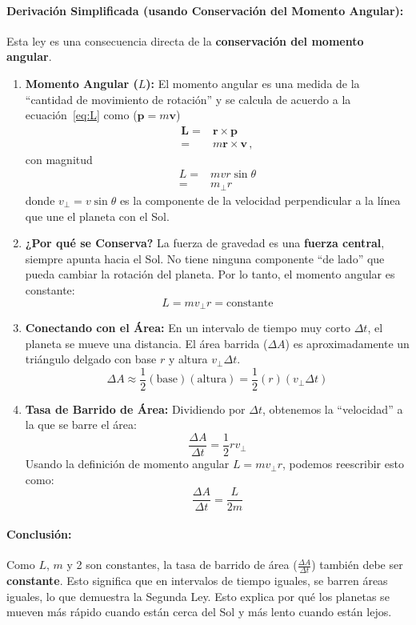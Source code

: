 \documentclass[11pt,a4paper]{book}
\begin{document}
\paragraph{Derivación Simplificada (usando Conservación del Momento Angular):}
Esta ley es una consecuencia directa de la \textbf{conservación del momento angular}.
\begin{enumerate}
    \item \textbf{Momento Angular ($L$):} El momento angular es una medida de la ``cantidad de movimiento de rotación'' y se calcula de acuerdo a la ecuación~\eqref{eq:L} como ($\boldsymbol{p} = m\boldsymbol{v}$)
    \begin{align*}
        \boldsymbol{L} = &\boldsymbol{r}\times\boldsymbol{p}\nonumber\\
        =& m \boldsymbol{r}\times\boldsymbol{v}\,,
    \end{align*}
    con magnitud
    \begin{align}
    \label{eq:Leqmvr}
     L =& m v r\sin\theta\nonumber\\
       =& m_{\perp} r
    \end{align}
    donde $v_{\perp}=v\sin\theta$ es la componente de la velocidad perpendicular a la línea que une el planeta con el Sol.

    \item \textbf{¿Por qué se Conserva?} La fuerza de gravedad es una \textbf{fuerza central}, siempre apunta hacia el Sol. No tiene ninguna componente ``de lado'' que pueda cambiar la rotación del planeta. Por lo tanto, el momento angular es constante:
    \[ L = m v_{\perp} r = \text{constante} \]

    \item \textbf{Conectando con el Área:} En un intervalo de tiempo muy corto $\Delta t$, el planeta se mueve una distancia. El área barrida ($\Delta A$) es aproximadamente un triángulo delgado con base $r$ y altura $v_{\perp} \Delta t$.
    \[ \Delta A \approx \frac{1}{2} (\text{base}) (\text{altura}) = \frac{1}{2} (r) (v_{\perp} \Delta t) \]

    \item \textbf{Tasa de Barrido de Área:} Dividiendo por $\Delta t$, obtenemos la ``velocidad'' a la que se barre el área:
    \[ \frac{\Delta A}{\Delta t} = \frac{1}{2} r v_{\perp} \]
    Usando la definición de momento angular $L = m v_{\perp} r$, podemos reescribir esto como:
    \[ \frac{\Delta A}{\Delta t} = \frac{L}{2m} \]
\end{enumerate}
\paragraph{Conclusión:} Como $L$, $m$ y 2 son constantes, la tasa de barrido de área ($\frac{\Delta A}{\Delta t}$) también debe ser \textbf{constante}. Esto significa que en intervalos de tiempo iguales, se barren áreas iguales, lo que demuestra la Segunda Ley. Esto explica por qué los planetas se mueven más rápido cuando están cerca del Sol y más lento cuando están lejos.
\end{document}
